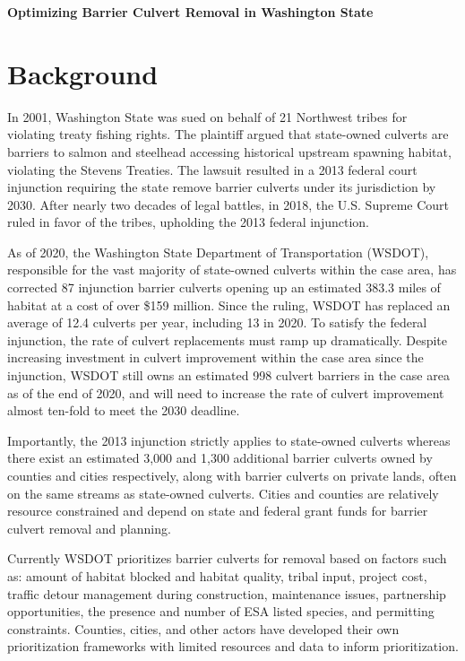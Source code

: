 \documentclass[12pt]{elsarticle}
\begin{document}
\begin{center} \textbf{Optimizing Barrier Culvert Removal in Washington State} \end{center}


\section{Background} 
In 2001, Washington State was sued on behalf of 21 Northwest tribes for violating treaty fishing rights. The plaintiff argued that state-owned culverts are barriers to salmon and steelhead accessing historical upstream spawning habitat, violating the Stevens Treaties. The lawsuit resulted in a 2013 federal court injunction requiring the state remove barrier culverts under its jurisdiction by 2030. After nearly two decades of legal battles, in 2018, the U.S. Supreme Court ruled in favor of the tribes, upholding the 2013 federal injunction. 

As of 2020, the Washington State Department of Transportation (WSDOT), responsible for the vast majority of state-owned culverts within the case area, has corrected 87 injunction barrier culverts opening up an estimated 383.3 miles of habitat at a cost of over \$159 million. Since the ruling, WSDOT has replaced an average of 12.4 culverts per year, including 13 in 2020. To satisfy the federal injunction, the rate of culvert replacements must ramp up dramatically. Despite increasing investment in culvert improvement within the case area since the injunction, WSDOT still owns an estimated 998 culvert barriers in the case area as of the end of 2020, and will need to increase the rate of culvert improvement almost ten-fold to meet the 2030 deadline.  

Importantly, the 2013 injunction strictly applies to state-owned culverts whereas there exist an estimated 3,000 and 1,300 additional barrier culverts owned by counties and cities respectively, along with barrier culverts on private lands, often on the same streams as state-owned culverts. Cities and counties are relatively resource constrained and depend on state and federal grant funds for barrier culvert removal and planning.

Currently WSDOT prioritizes barrier culverts for removal based on factors such as: amount of habitat blocked and habitat quality, tribal input, project cost, traffic detour management during construction, maintenance issues, partnership opportunities, the presence and number of ESA listed species, and permitting constraints. Counties, cities, and other actors have developed their own prioritization frameworks with limited resources and data to inform prioritization. 
\end{document}
